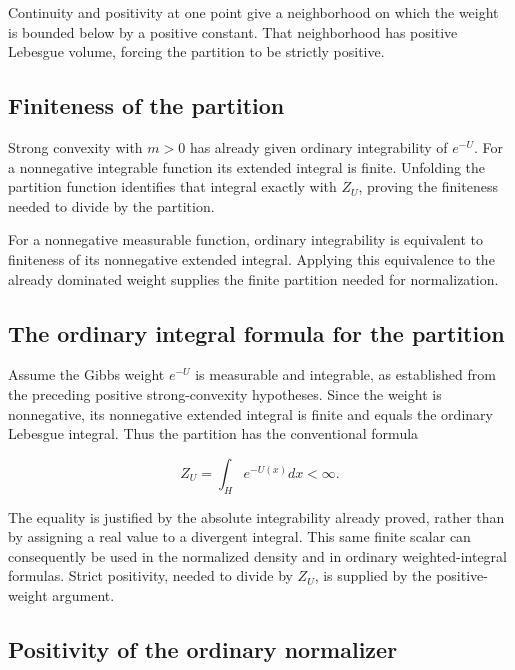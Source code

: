 \documentclass[11pt,a4paper]{article}
\begin{document}
Continuity and positivity at one point give a neighborhood on which the weight is bounded below by a positive constant. That neighborhood has positive Lebesgue volume, forcing the partition to be strictly positive.


\subsection{\texorpdfstring{Finiteness of the partition}{Finiteness of the partition}}


Strong convexity with \(m>0\) has already given ordinary integrability of \(e^{-U}\). For a nonnegative integrable function its extended integral is finite. Unfolding the partition function identifies that integral exactly with \(Z_U\), proving the finiteness needed to divide by the partition.



For a nonnegative measurable function, ordinary integrability is equivalent to finiteness of its nonnegative extended integral. Applying this equivalence to the already dominated weight supplies the finite partition needed for normalization.


\subsection{\texorpdfstring{The ordinary integral formula for the partition}{The ordinary integral formula for the partition}}


Assume the Gibbs weight \(e^{-U}\) is measurable and integrable, as established from the preceding positive strong-convexity hypotheses. Since the weight is nonnegative, its nonnegative extended integral is finite and equals the ordinary Lebesgue integral. Thus the partition has the conventional formula

\[Z_U=\int_H e^{-U(x)}dx<\infty.\]


The equality is justified by the absolute integrability already proved, rather than by assigning a real value to a divergent integral. This same finite scalar can consequently be used in the normalized density and in ordinary weighted-integral formulas. Strict positivity, needed to divide by \(Z_U\), is supplied by the positive-weight argument.


\subsection{\texorpdfstring{Positivity of the ordinary normalizer}{Positivity of the ordinary normalizer}}
\end{document}
